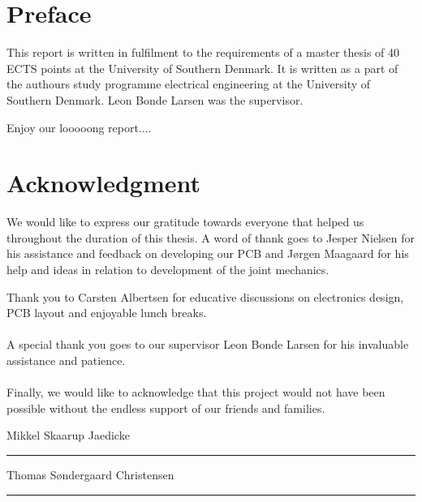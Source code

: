 
\section*{Preface}
This report is written in fulfilment to the requirements of a master thesis of 40 ECTS points at the University of Southern Denmark.
It is written as a part of the authours study programme electrical engineering at the University of Southern Denmark.
Leon Bonde Larsen was the supervisor.


Enjoy our looooong report....


\section*{Acknowledgment}

We would like to express our gratitude towards everyone that helped us throughout the duration of this thesis.
A word of thank goes to Jesper Nielsen for his assistance and feedback on developing our PCB and Jørgen Maagaard for his help and ideas in relation to development of the joint mechanics. 

Thank you to Carsten Albertsen for educative discussions on electronics design, PCB layout and enjoyable lunch breaks. 
\\~\\
A special thank you goes to our supervisor Leon Bonde Larsen for his invaluable assistance and patience.
\\~\\
Finally, we would like to acknowledge that this project would not have been possible without the endless support of our friends and families.


\vspace{1cm}
\begin{center}
	\begin{minipage}[t]{.49\textwidth}\large
		\begin{center}
		Mikkel Skaarup Jaedicke\\
		\vspace{1cm}
		\hrule
		\vspace{0.5cm}
		Thomas Søndergaard Christensen
		\vspace{1cm}
		\hrule
		\end{center} 
	\end{minipage}
\end{center}

